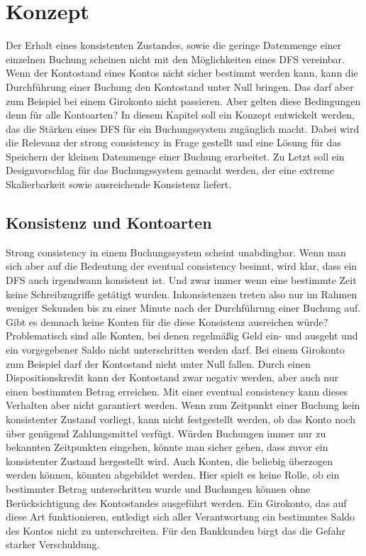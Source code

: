 \documentclass[12pt,oneside,a4paper,parskip]{scrbook}
\begin{document}
\chapter{Konzept}
\label{concept}
Der Erhalt eines konsistenten Zustandes, sowie die geringe Datenmenge einer einzelnen Buchung scheinen nicht mit den Möglichkeiten eines DFS vereinbar. Wenn der Kontostand eines Kontos nicht sicher bestimmt werden kann, kann die Durchführung einer Buchung den Kontostand unter Null bringen. Das darf aber zum Beispiel bei einem Girokonto nicht passieren. Aber gelten diese Bedingungen denn für alle Kontoarten? In diesem Kapitel soll ein Konzept entwickelt werden, das die Stärken eines DFS für ein Buchungssystem zugänglich macht. Dabei wird die Relevanz der strong consistency in Frage gestellt und eine Lösung für das Speichern der kleinen Datenmenge einer Buchung erarbeitet. Zu Letzt soll ein Designvorschlag für das Buchungssystem gemacht werden, der eine extreme Skalierbarkeit sowie ausreichende Konsistenz liefert.

\section{Konsistenz und Kontoarten}
\label{konsistenzKonten}
Strong consistency in einem Buchungssystem scheint unabdingbar. Wenn man sich aber auf die Bedeutung der eventual consistency besinnt, wird klar, dass ein DFS auch irgendwann konsistent ist. Und zwar immer wenn eine bestimmte Zeit keine Schreibzugriffe getätigt wurden. 
Inkonsistenzen treten also nur im Rahmen weniger Sekunden bis zu einer Minute nach der Durchführung einer Buchung auf. Gibt es demnach keine Konten für die diese Konsistenz ausreichen würde? Problematisch sind alle Konten, bei denen regelmäßig Geld ein- und ausgeht und ein vorgegebener Saldo nicht unterschritten werden darf. Bei einem Girokonto zum Beispiel darf der Kontostand nicht unter Null fallen. Durch einen Dispositionskredit kann der Kontostand zwar negativ werden, aber auch nur einen bestimmten Betrag erreichen. Mit einer eventual consistency kann dieses Verhalten aber nicht garantiert werden. Wenn zum Zeitpunkt einer Buchung kein konsistenter Zustand vorliegt, kann nicht festgestellt werden, ob das Konto noch über genügend Zahlungsmittel verfügt. Würden Buchungen immer nur zu bekannten Zeitpunkten eingehen, könnte man sicher gehen, dass zuvor ein konsistenter Zustand hergestellt wird. Auch Konten, die beliebig überzogen werden können, könnten abgebildet werden. Hier spielt es keine Rolle, ob ein bestimmter Betrag unterschritten wurde und Buchungen können ohne Berücksichtigung des Kontostandes ausgeführt werden. Ein Girokonto, das auf diese Art funktionieren, entledigt sich aller Verantwortung ein bestimmtes Saldo des Kontos nicht zu unterschreiten. Für den Bankkunden birgt das die Gefahr starker Verschuldung.
\end{document}
